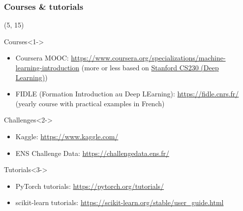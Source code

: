\begin{frame}
  \frametitle{Courses \& tutorials}

  \begin{textblock}{90}(5, 15)
    \begin{block}{Courses}<1->
      \begin{itemize}
      \item Coursera MOOC:
        \url{https://www.coursera.org/specializations/machine-learning-introduction} (more or less based on \href{https://cs230.stanford.edu/}{Stanford CS230 (Deep Learning)})
      \item FIDLE (Formation Introduction au Deep LEarning): \url{https://fidle.cnrs.fr/}
        (yearly course with practical examples in French)
      \end{itemize}
    \end{block}

    \begin{block}{Challenges}<2->
      \begin{itemize}
      \item Kaggle: \url{https://www.kaggle.com/}
      \item ENS Challenge Data: \url{https://challengedata.ens.fr/}
      \end{itemize}
    \end{block}

    \begin{block}{Tutorials}<3->
      \begin{itemize}
      \item PyTorch tutorials: \url{https://pytorch.org/tutorials/}
      \item scikit-learn tutorials:
        \url{https://scikit-learn.org/stable/user_guide.html}
      \end{itemize}
    \end{block}
  \end{textblock}
\end{frame}
